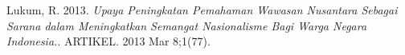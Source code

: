 Lukum, R. 2013. \textit{Upaya Peningkatan Pemahaman Wawasan Nusantara Sebagai Sarana dalam Meningkatkan Semangat Nasionalisme Bagi Warga Negara Indonesia.}. ARTIKEL. 2013 Mar 8;1(77).

